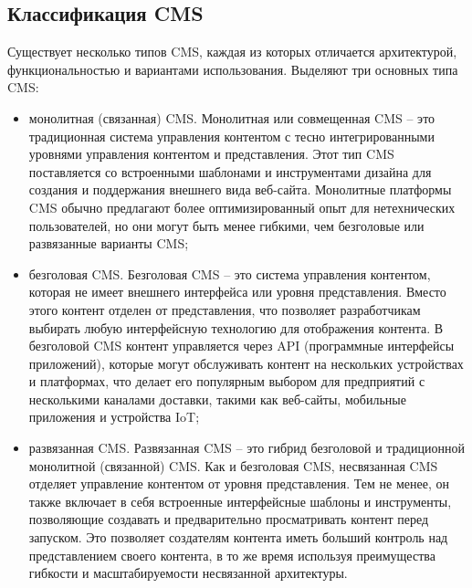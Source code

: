 \subsection{Классификация CMS}
Существует несколько типов CMS, каждая из которых отличается архитектурой, функциональностью и вариантами использования. Выделяют три основных типа CMS:
\begin{itemize}
	\item монолитная (связанная) CMS. Монолитная или совмещенная CMS -- это традиционная система управления контентом с тесно интегрированными уровнями управления контентом и представления. Этот тип CMS поставляется со встроенными шаблонами и инструментами дизайна для создания и поддержания внешнего вида веб-сайта. Монолитные платформы CMS обычно предлагают более оптимизированный опыт для нетехнических пользователей, но они могут быть менее гибкими, чем безголовые или развязанные варианты CMS;
	\item безголовая CMS. Безголовая CMS -- это система управления контентом, которая не имеет внешнего интерфейса или уровня представления. Вместо этого контент отделен от представления, что позволяет разработчикам выбирать любую интерфейсную технологию для отображения контента. В безголовой CMS контент управляется через API (программные интерфейсы приложений), которые могут обслуживать контент на нескольких устройствах и платформах, что делает его популярным выбором для предприятий с несколькими каналами доставки, такими как веб-сайты, мобильные приложения и устройства IoT;
	\item развязанная CMS. Развязанная CMS -- это гибрид безголовой и традиционной монолитной (связанной) CMS. Как и безголовая CMS, несвязанная CMS отделяет управление контентом от уровня представления. Тем не менее, он также включает в себя встроенные интерфейсные шаблоны и инструменты, позволяющие создавать и предварительно просматривать контент перед запуском. Это позволяет создателям контента иметь больший контроль над представлением своего контента, в то же время используя преимущества гибкости и масштабируемости несвязанной архитектуры.
\end{itemize}
